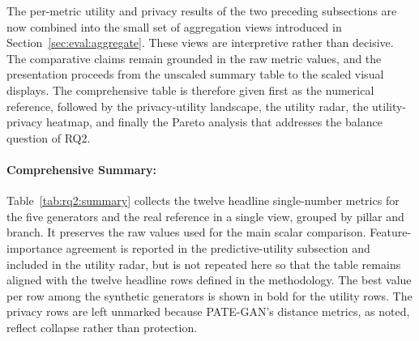 The per-metric utility and privacy results of the two preceding
subsections are now combined into the small set of aggregation views
introduced in Section~\ref{sec:eval:aggregate}. These views are
interpretive rather than decisive. The comparative claims remain grounded
in the raw metric values, and the presentation proceeds from the unscaled
summary table to the scaled visual displays. The comprehensive table is
therefore given first as the numerical reference, followed by the
privacy-utility landscape, the utility radar, the utility-privacy
heatmap, and finally the Pareto analysis that addresses the balance
question of RQ2.

\paragraph{Comprehensive Summary:}
\label{sec:results:rq2:table}

Table~\ref{tab:rq2:summary} collects the twelve headline single-number
metrics for the five generators and the real reference in a single view,
grouped by pillar and branch. It preserves the raw values used for the
main scalar comparison. Feature-importance agreement is reported in the
predictive-utility subsection and included in the utility radar, but is
not repeated here so that the table remains aligned with the twelve
headline rows defined in the methodology. The best value per row among
the synthetic generators is shown in bold for the utility rows. The
privacy rows are left unmarked because PATE-GAN's distance metrics, as
noted, reflect collapse rather than protection.

\begin{table}[H]
\centering
\footnotesize
\setlength{\tabcolsep}{3.5pt}
\caption{Comprehensive summary of the twelve headline metrics across the
five generators and the real (TRTR) reference. Arrows indicate the
preferred direction; ($\approx 0.5$) indicates that values closest to
$0.5$ are best, and ($\approx 0$) indicates negligible leakage.The nearest-neighbour distance and its normalised ratio should be
interpreted relative to the real-data reference values of
$\approx 2.02$ and $\approx 1$, respectively. Lower values indicate
increased proximity risk. Higher values suggest greater separation only
when the synthetic data remain consistent with the real-data
distribution. Otherwise, they may indicate poor fidelity rather than
stronger privacy. Bold marks the best synthetic value on each utility row.
PATE-GAN's nearest-neighbour distance and ratio are not treated as
protective because they reflect off-manifold output and should be read
with Section~\ref{sec:results:rq2:privacy}.}
\label{tab:rq2:summary}

\end{table}

